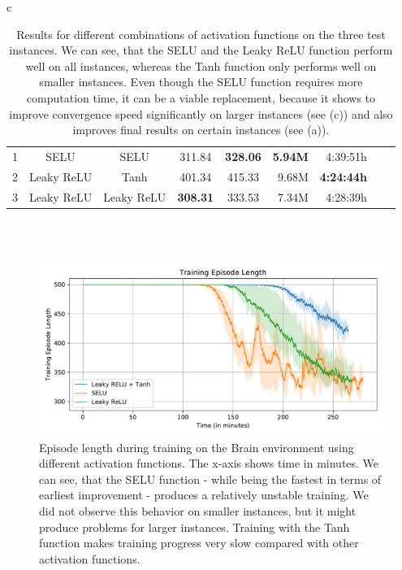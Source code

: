 \begin{table}[ht]
\begin{center}
\begin{tabular}{c}
\begin{tabular}{rccccrrrr}
                \midrule
                1 & SELU & SELU & 311.84 & \textbf{328.06} & \textbf{5.94M} & 4:39:51h \\
                2 & Leaky ReLU & Tanh & 401.34 & 415.33 & 9.68M & \textbf{4:24:44h} \\
                3 & Leaky ReLU & Leaky ReLU & \textbf{308.31} & 333.53 & 7.34M & 4:28:39h \\
                \bottomrule
            \end{tabular}\\
             \\
        \end{tabular}
    \end{center}
    \caption[Evaluation Results for Different Combinations of Activation Functions]{Results for different combinations of activation functions on the three test instances. We can see, that the SELU and the Leaky ReLU function perform well on all instances, whereas the Tanh function only performs well on smaller instances. Even though the SELU function requires more computation time, it can be a viable replacement, because it shows to improve convergence speed significantly on larger instances (see (c)) and also improves final results on certain instances (see (a)).} \label{tab:Eval/ActivationFunctions}
\end{table}

\begin{figure}[htp]
    \begin{center}
        \includegraphics[clip, width=0.8\columnwidth]{figures/evaluation/networks/maze0122_ep_len.pdf}
    \end{center}
    \caption[Episode Length Using Different Activation Functions on the Brain Environment]{Episode length during training on the Brain environment using different activation functions. The x-axis shows time in minutes. We can see, that the SELU function - while being the fastest in terms of earliest improvement - produces a relatively unstable training. We did not observe this behavior on smaller instances, but it might produce problems for larger instances. Training with the Tanh function makes training progress very slow compared with other activation functions.} \label{fig:Eval/ActivationFunctions/Maze0122}
\end{figure}

